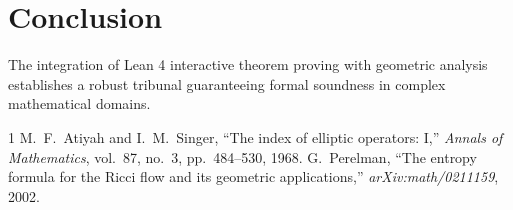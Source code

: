 \documentclass[10pt,journal,compsoc]{IEEEtran}
\begin{document}
\section{Conclusion}
The integration of Lean 4 interactive theorem proving with geometric analysis establishes a robust tribunal guaranteeing formal soundness in complex mathematical domains.

\begin{thebibliography}{1}
M.~F.~Atiyah and I.~M.~Singer, ``The index of elliptic operators: I,'' \emph{Annals of Mathematics}, vol.~87, no.~3, pp.~484--530, 1968.
G.~Perelman, ``The entropy formula for the Ricci flow and its geometric applications,'' \emph{arXiv:math/0211159}, 2002.
\end{thebibliography}
\end{document}
